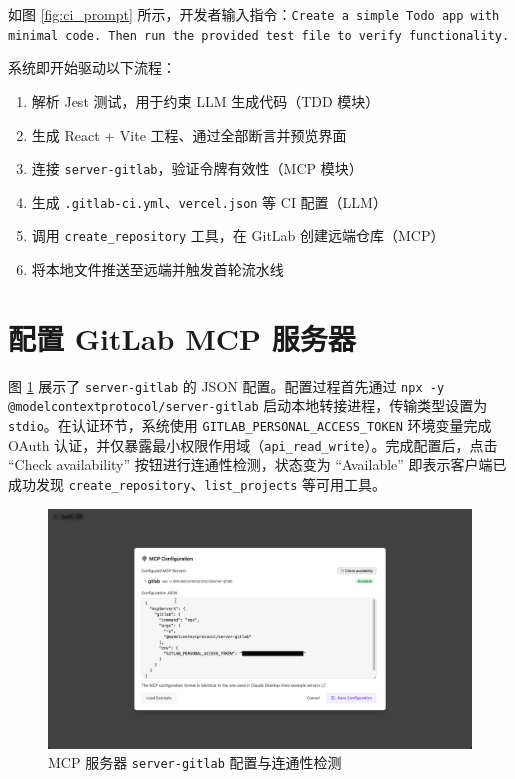 如图 \ref{fig:ci_prompt} 所示，开发者输入指令：\texttt{Create a simple Todo app with minimal code. Then run the provided test file to verify functionality.}

系统即开始驱动以下流程：

\begin{enumerate}
  \item 解析 Jest 测试，用于约束 LLM 生成代码（TDD 模块）
  \item 生成 React + Vite 工程、通过全部断言并预览界面
  \item 连接 \texttt{server-gitlab}，验证令牌有效性（MCP 模块）
  \item 生成 \texttt{.gitlab-ci.yml}、\texttt{vercel.json} 等 CI 配置（LLM）
  \item 调用 \texttt{create\_repository} 工具，在 GitLab 创建远端仓库（MCP）
  \item 将本地文件推送至远端并触发首轮流水线
\end{enumerate}

\section{配置 GitLab MCP 服务器}
\label{sec:cicd-mcp-config}

图 \ref{fig:mcp_gitlab_cfg} 展示了 \texttt{server-gitlab} 的 JSON 配置。配置过程首先通过 \texttt{npx -y @modelcontextprotocol/server-gitlab} 启动本地转接进程，传输类型设置为 \texttt{stdio}。在认证环节，系统使用 \texttt{GITLAB\_PERSONAL\_ACCESS\_TOKEN} 环境变量完成 OAuth 认证，并仅暴露最小权限作用域（\texttt{api\_read\_write}）。完成配置后，点击 “Check availability” 按钮进行连通性检测，状态变为 “Available” 即表示客户端已成功发现 \texttt{create\_repository}、\texttt{list\_projects} 等可用工具。

\begin{figure}
  \centering
  \includegraphics[width=\textwidth]{figures/screenshots/ci-cd/mcp_gitlab_cfg.png}
  \caption{MCP 服务器 \texttt{server-gitlab} 配置与连通性检测}
  \label{fig:mcp_gitlab_cfg}
\end{figure}

